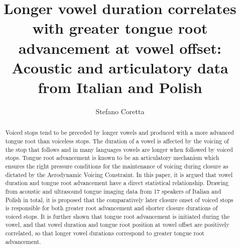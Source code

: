 \documentclass[preprint]{JASAnew}
\begin{document}

\title[]{Longer vowel duration correlates with greater tongue root advancement at
vowel offset: Acoustic and articulatory data from Italian and Polish}



\author{Stefano Coretta}






\begin{abstract}
Voiced stops tend to be preceded by longer vowels and produced with a
more advanced tongue root than voiceless stops. The duration of a vowel
is affected by the voicing of the stop that follows and in many
languages vowels are longer when followed by voiced stops. Tongue root
advancement is known to be an articulatory mechanism which ensures the
right pressure conditions for the maintenance of voicing during closure
as dictated by the Aerodynamic Voicing Constraint. In this paper, it is
argued that vowel duration and tongue root advancement have a direct
statistical relationship. Drawing from acoustic and ultrasound tongue
imaging data from 17 speakers of Italian and Polish in total, it is
proposed that the comparatively later closure onset of voiced stops is
responsible for both greater root advancement and shorter closure
durations of voiced stops. It is further shown that tongue root
advancement is initiated during the vowel, and that vowel duration and
tongue root position at vowel offset are positively correlated, so that
longer vowel durations correspond to greater tongue root advancement.
\end{abstract}
\end{document}

